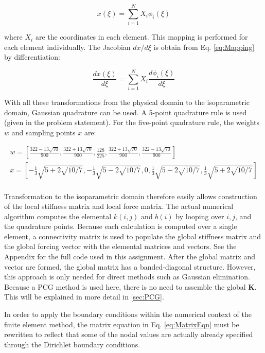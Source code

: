 \documentclass[10pt]{article}
\begin{document}
\begin{equation}
\label{eq:Mapping}
x(\xi)=\sum_{i=1}^{N} X_i\phi_i(\xi)
\end{equation}

where \(X_i\) are the coordinates in each element. This mapping is performed for each element individually. The Jacobian \(dx/d\xi\) is obtain from Eq. \eqref{eq:Mapping} by differentiation:

\begin{equation}
\frac{dx(\xi)}{d\xi}=\sum_{i=1}^{N} X_i\frac{d\phi_i(\xi)}{d\xi}
\end{equation}

With all these transformations from the physical domain to the isoparametric domain, Gaussian quadrature can be used. A 5-point quadrature rule is used (given in the problem statement). For the five-point quadrature rule, the weights \(w\) and sampling points \(x\) are:

\begin{equation}
\begin{aligned}
w=\left\lbrack\frac{322-13\sqrt{70}}{900}, \frac{322+13\sqrt{70}}{900}, \frac{128}{225}, \frac{322+13\sqrt{70}}{900}, \frac{322-13\sqrt{70}}{900}\right\rbrack\\
x=\left\lbrack-\frac{1}{3}\sqrt{5+2\sqrt{10/7}}, -\frac{1}{3}\sqrt{5-2\sqrt{10/7}}, 0, \frac{1}{3}\sqrt{5-2\sqrt{10/7}}, \frac{1}{3}\sqrt{5+2\sqrt{10/7}}\right\rbrack\\
\end{aligned}
\end{equation} 

Transformation to the isoparametric domain therefore easily allows construction of the local stiffness matrix and local force matrix. The actual numerical algorithm computes the elemental \(k(i,j)\) and \(b(i)\) by looping over \(i, j\), and the quadrature points. Because each calculation is computed over a single element, a connectivity matrix is used to populate the global stiffness matrix and the global forcing vector with the elemental matrices and vectors. See the Appendix for the full code used in this assignment. After the global matrix and vector are formed, the global matrix has a banded-diagonal structure. However, this approach is only needed for direct methods such as Gaussian elimination. Because a PCG method is used here, there is no need to assemble the global \(\textbf{K}\). This will be explained in more detail in \ref{sec:PCG}.

In order to apply the boundary conditions within the numerical context of the finite element method, the matrix equation in Eq. \eqref{eq:MatrixEqn} must be rewritten to reflect that some of the nodal values are actually already specified through the Dirichlet boundary conditions. 
\end{document}
